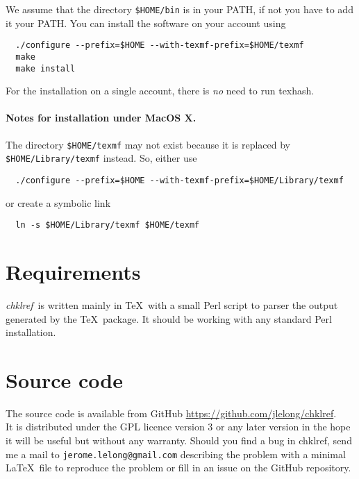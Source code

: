 \documentclass[a4paper,11pt,twoside]{article}
\def\chk{{\it chklref}}
\begin{document}
We assume that the directory \verb!$HOME/bin! is in your PATH, if not you have to add it
your PATH. You can install the software on your account using
\begin{verbatim}
  ./configure --prefix=$HOME --with-texmf-prefix=$HOME/texmf
  make
  make install
\end{verbatim}
For the installation on a single account, there is \emph{no} need to run
texhash.


\paragraph{Notes for installation under MacOS X.}

The directory \verb!$HOME/texmf! may not exist because it is replaced by
\verb!$HOME/Library/texmf! instead. So, either use
\begin{verbatim}
  ./configure --prefix=$HOME --with-texmf-prefix=$HOME/Library/texmf
\end{verbatim}
or create a symbolic link
\begin{verbatim}
  ln -s $HOME/Library/texmf $HOME/texmf
\end{verbatim}



\section{Requirements}

\chk\ is written mainly in \TeX\ with a small Perl script to parser the output
generated by the \TeX\ package. It should be working with any standard Perl
installation.

\section{Source code}

The source code is available from GitHub
\url{https://github.com/jlelong/chklref}.
\\

\noindent It is distributed under the GPL licence version 3 or any later version
in the hope it will be useful but without any warranty. Should you find a bug in
chklref, send me a mail to \verb!jerome.lelong@gmail.com! describing the problem
with a minimal \LaTeX\ file to reproduce the problem or fill in an issue on the
GitHub repository.
\end{document}
